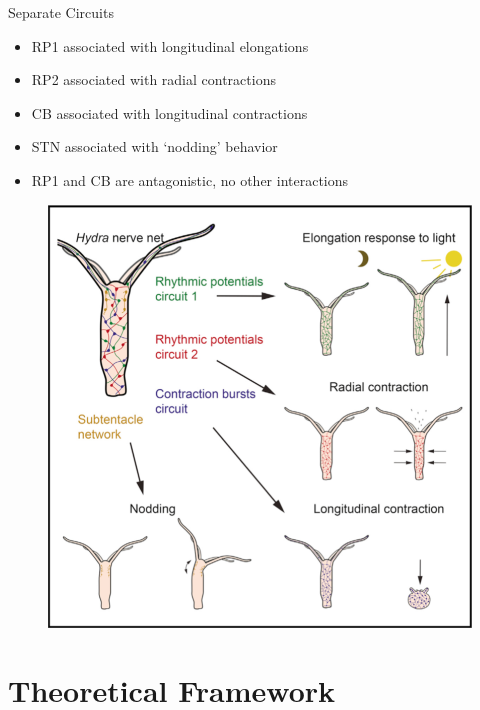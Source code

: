 \documentclass[leqno,presentation,unknownkeysallowed]{beamer}
\begin{document}
\begin{frame}{Separate Circuits}
\begin{itemize}
\item RP1 associated with longitudinal elongations
\item RP2 associated with radial contractions
\item CB associated with longitudinal contractions
\item STN associated with `nodding' behavior
\item RP1 and CB are antagonistic, no other interactions
\end{itemize}
\begin{figure}
\center
\includegraphics[scale=0.325]{hydra_movements.png}
\end{figure}
\end{frame}

\section{Theoretical Framework}
\end{document}
